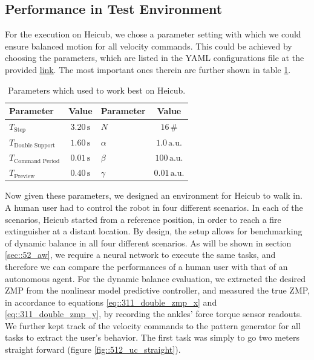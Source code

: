 \subsection{Performance in Test Environment}
\label{sec::512_pt}
For the execution on Heicub, we chose a parameter setting with which we could ensure balanced motion for all velocity commands. This could be achieved by choosing the parameters, which are listed in the YAML configurations file at the provided \href{https://github.com/mhubii/nmpc_pattern_generator/blob/719fde0bb73925923de85cbf379c5523e075dfeb/libs/pattern_generator/configs.yaml#L1}{\underline{link}}. The most important ones therein are further shown in table \ref{tab::512_params}.
\begin{table}
	\centering
	\caption{Parameters which used to work best on Heicub.}
	\begin{tabular}{lclc}
		Parameter&Value&Parameter&Value\\
		\hline
		$T_{\text{Step}}$ & $3.20\,\text{s}$ & $N$ & $16\,\text{\#}$ \\
		$T_{\text{Double Support}}$ & $1.60\,\text{s}$ & $\alpha$ & $1.0\,\text{a.u.}$ \\
		$T_{\text{Command Period}}$  & $0.01\,\text{s}$& $\beta$ & $100\,\text{a.u.}$ \\
		$T_{\text{Preview}}$ & $0.40\,\text{s}$ & $\gamma$ & $0.01\,\text{a.u.}$
	\end{tabular}
	\label{tab::512_params}
\end{table}
Now given these parameters, we designed an environment for Heicub to walk in. A human user had to control the robot in four different scenarios. In each of the scenarios, Heicub started from a reference position, in order to reach a fire extinguisher at a distant location. By design, the setup allows for benchmarking of dynamic balance in all four different scenarios. As will be shown in section \ref{sec::52_aw}, we require a neural network to execute the same tasks, and therefore we can compare the performances of a human user with that of an autonomous agent. For the dynamic balance evaluation, we extracted the desired ZMP from the nonlinear model predictive controller, and measured the true ZMP, in accordance to equations \ref{eq::311_double_zmp_x} and \ref{eq::311_double_zmp_y}, by recording the ankles' force torque sensor readouts. We further kept track of the velocity commands to the pattern generator for all tasks to extract the user's behavior. The first task was simply to go two meters straight forward (figure \ref{fig::512_uc_straight}).
